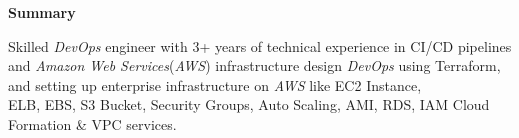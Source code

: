 \documentclass[10pt,A4]{article}
\newcommand{\cvsection}[1]
{
	\begin{center}
		\large\textcolor{sectcol}{\textbf{#1}}
	\end{center}
}
\begin{document}
\vspace{-6pt}
\cvsection{Summary}
Skilled \emph{DevOps} engineer with 3+ years of technical experience in CI/CD pipelines and \emph{Amazon Web Services}(\emph{AWS}) infrastructure design \emph{DevOps} using Terraform, and setting up enterprise infrastructure on \emph{AWS} like EC2 Instance,\\ ELB, EBS, S3 Bucket, Security Groups, Auto Scaling, AMI, RDS, IAM Cloud Formation \& VPC services.\\
\end{document}
